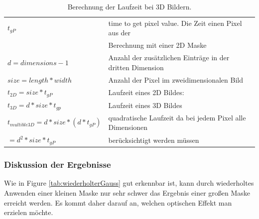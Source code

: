 \documentclass[12pt,german]{article}
\begin{document}
\begin{table}
\begin{tabular}{| l | l |}
	\hline
	$t_{gP}$ & time to get pixel value. Die Zeit einen Pixel aus der \\
	& Berechnung mit einer 2D Maske \\
	\hline	
	$d  = dimensions - 1$ & Anzahl der zusätzlichen Einträge in der dritten Dimension \\
	\hline	
	$size = length  * width $ & Anzahl der Pixel im zweidimensionalen Bild \\
	\hline	
	$t_{2D} = size * t_{gP} $ & Laufzeit eines 2D Bildes:\\
	\hline	
	$t_{3D} = d * size * t_{gp} $ & Laufzeit eines 3D Bildes \\
	\hline	
	$t_{multible3D} = d * size * ( d * t_{gP} ) $ & quadratische Laufzeit da bei jedem Pixel alle Dimensionen\\
	$               = d^2 *size * t_{gP}$       &  berücksichtigt werden müssen \\
	\hline
	
\end{tabular}

\caption{Berechnung der Laufzeit bei 3D Bildern.}
\label{calculation}
\end{table}


\subsubsection{Diskussion der Ergebnisse}
Wie in Figure \ref{tab:wiederholterGauss} gut erkennbar ist, kann durch wiederholtes Anwenden einer kleinen Maske nur sehr schwer das Ergebnis einer großen Maske erreicht werden. Es kommt daher darauf an, welchen optischen Effekt man erzielen möchte.
\end{document}
